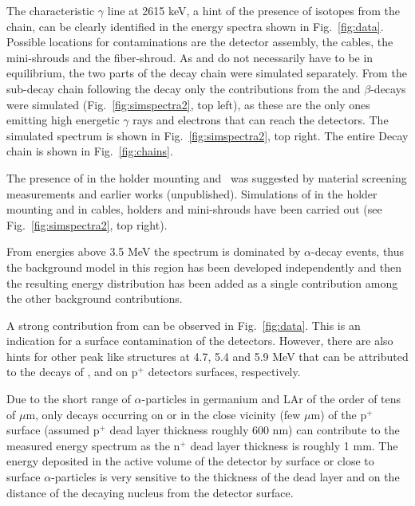  The characteristic $\gamma$ line at 2615 keV, a hint of the presence of isotopes from the  chain, can be clearly identified in the energy spectra shown in Fig.~\ref{fig:data}. Possible locations for contaminations are the detector assembly, the cables, the mini-shrouds and the fiber-shroud. As  and  do not necessarily have to be in equilibrium, the two parts of the decay chain were simulated separately. From the sub-decay chain following the  decay only the contributions from the  and  $\beta$-decays were simulated (Fig.~\ref{fig:simspectra2}, top left), as these are the only ones emitting high energetic $\gamma$ rays and electrons that can reach the detectors. The simulated  spectrum is shown in Fig.~\ref{fig:simspectra2}, top right. The entire  Decay chain is shown in Fig.~\ref{fig:chains}.

 The presence of  in the holder mounting and  was suggested by material screening measurements and earlier works (unpublished). Simulations of  in the holder mounting and  in cables, holders and mini-shrouds have been carried out (see Fig.~\ref{fig:simspectra2}, top right).

 From energies above 3.5 MeV the spectrum is dominated by $\alpha$-decay events, thus the background model in this region has been developed independently and then the resulting energy distribution has been added as a single contribution among the other background contributions.

A strong contribution from  can be observed in Fig.~\ref{fig:data}. This is an indication for a surface contamination of the detectors. However, there are also hints for other peak like structures at 4.7, 5.4 and 5.9 MeV that can be attributed to the decays of ,  and  on p$^+$ detectors surfaces, respectively.

Due to the short range of $\alpha$-particles in germanium and LAr of the order of tens of $\mu$m, only decays occurring on or in the close vicinity (few $\mu$m) of the p$^+$ surface (assumed p$^+$ dead layer thickness roughly 600 nm) can contribute to the measured energy spectrum as the n$^+$ dead layer thickness is roughly 1 mm. The energy deposited in the active volume of the detector by surface or close to surface $\alpha$-particles is very sensitive to the thickness of the dead layer and on the distance of the decaying nucleus from the detector surface.

